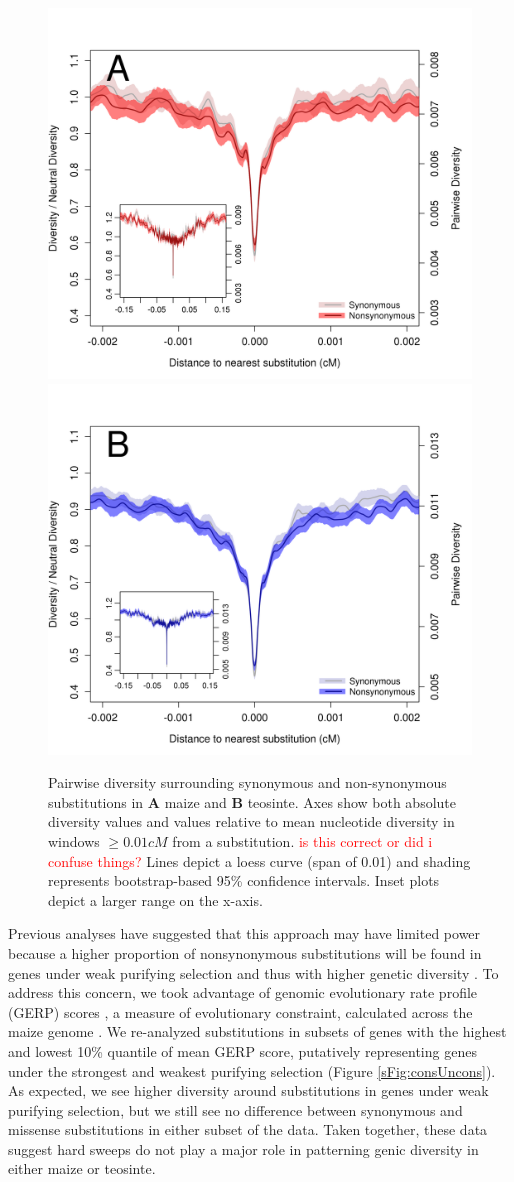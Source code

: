 \documentclass{pnastwo}
\newcommand{\jri}[1]{\textcolor{red}{\scriptsize #1}}
\begin{document}
\begin{article}
\begin{figure}
\centering
\includegraphics[width=.45\textwidth]{FigsAndFiles/plotDiversity_TvM_Folded2_Significance_Aug}
\hspace{0.05\textwidth} \includegraphics[width=.45\textwidth]{FigsAndFiles/plotDiversity_TvT_Folded2_Significance_Aug}
\caption{Pairwise diversity surrounding synonymous and non-synonymous
  substitutions in {\bf A} maize and {\bf B} teosinte. Axes show both absolute diversity values and values relative to mean nucleotide diversity in windows $\geq 0.01 cM$ from a substitution. \jri{is this correct or did i confuse things?}
 Lines depict a loess curve (span of 0.01) and shading represents bootstrap-based 95\% confidence intervals. Inset plots depict a larger range on the x-axis. \label{fig:hardSweeps}}
\end{figure}

Previous analyses have suggested that this approach may have limited power because a higher proportion of nonsynonymous substitutions will be found in genes under weak purifying selection and thus with higher genetic diversity \cite{enard2014}. 
To address this concern, we took advantage of genomic evolutionary rate profile (GERP) scores \cite{davydov2010}, a measure of evolutionary constraint, calculated across the maize genome \cite{rodgers2015}. 
We re-analyzed substitutions in subsets of genes with the highest and lowest 10\% quantile of mean GERP score, putatively representing genes under the strongest and weakest purifying selection  (Figure \ref{sFig:consUncons}). 
As expected, we see higher diversity around substitutions in genes under weak purifying selection, but we still see no difference between synonymous and missense substitutions in either subset of the data.
Taken together, these data suggest hard sweeps do not play a major role in patterning genic diversity in either maize or teosinte.


\end{article}
\end{document}

